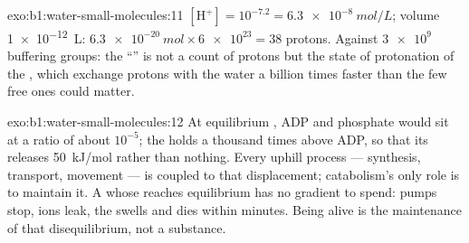 \begin{solution}{exo:b1:water-small-molecules:11}
$[\mathrm{H^+}] = 10^{-7.2} = \qty{6.3e-8}{mol/L}$; volume
\qty{1e-12}{L}: $\qty{6.3e-20}{mol}\times\num{6e23} = 38$ protons. Against
$\num{3e9}$ buffering groups: the ``'' is not a count of protons but the
state of protonation of the , which exchange protons with the
water a billion times faster than the few free ones could matter.
\end{solution}

\begin{solution}{exo:b1:water-small-molecules:12}
At equilibrium , ADP and phosphate would sit at a ratio of about
$10^{-5}$; the  holds  a thousand times above ADP, so that its
 releases \qty{50}{kJ/mol} rather than nothing. Every uphill
process --- synthesis, transport, movement --- is coupled to that
displacement; catabolism's only role is to maintain it. A  whose 
reaches equilibrium has no gradient to spend: pumps stop, ions leak,
the  swells and dies within minutes. Being alive is the maintenance
of that disequilibrium, not a substance.
\end{solution}


